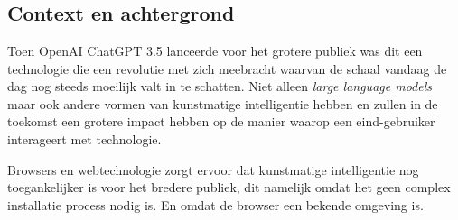 
\chapter{}
\label{ch:inleiding}



\section{Context en achtergrond} %
Toen OpenAI ChatGPT 3.5 lanceerde voor het grotere publiek was dit een technologie die een revolutie met zich meebracht waarvan de schaal vandaag de dag nog steeds moeilijk valt in te schatten. Niet alleen \textit{large language models} maar ook andere vormen van kunstmatige intelligentie hebben en zullen in de toekomst een grotere impact hebben op de manier waarop een eind-gebruiker interageert met technologie.

\bigbreak{}

Browsers en webtechnologie zorgt ervoor dat kunstmatige intelligentie nog toegankelijker is voor het bredere publiek, dit namelijk omdat het geen complex installatie process nodig is. En omdat de browser een bekende omgeving is.

